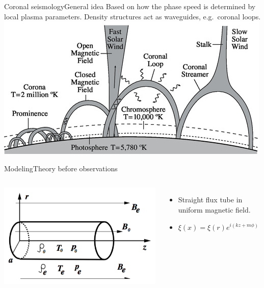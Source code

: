 \documentclass[table]{beamer}
\begin{document}
\begin{frame}{Coronal seismology}{General idea}
    Based on how the \textcolor{arylyellow}{phase} speed is determined by
    local plasma parameters. Density structures act as waveguides,
    e.g.\ \textcolor{arylyellow}{coronal loops}.
    \includegraphics[width=\textwidth]{loop_diagram.jpg}
\end{frame}%

\begin{frame}{Modeling}{Theory before observations}
    \begin{columns}
        \includegraphics[width=\textwidth]{cylinder.png}
        \begin{itemize}
            \item Straight flux tube in uniform magnetic field.
            \item $ \xi(x) = \xi(r)e^{i(kz+m\phi)}  $
        \end{itemize}
    \end{columns}
\end{frame}%
\end{document}
